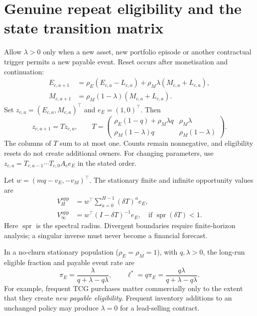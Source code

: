 \documentclass[11pt,a4paper]{article}
\begin{document}
\section{Genuine repeat eligibility and the state transition matrix}

Allow $\lambda>0$ only when a new asset, new portfolio episode or another contractual trigger permits a new payable event. Reset occurs after monetisation and continuation:
\begin{align}
 E_{c,a+1}&=\rho_E(E_{c,a}-L_{c,a})
             +\rho_M\lambda(M_{c,a}+L_{c,a}),\\
 M_{c,a+1}&=\rho_M(1-\lambda)(M_{c,a}+L_{c,a}).
\end{align}
Set $z_{c,a}=(E_{c,a},M_{c,a})^\top$ and $e_E=(1,0)^\top$. Then
\begin{equation}
 z_{c,a+1}=Tz_{c,a},\qquad
 T=\begin{pmatrix}
 \rho_E(1-q)+\rho_M\lambda q & \rho_M\lambda\\
 \rho_M(1-\lambda)q & \rho_M(1-\lambda)
 \end{pmatrix}.
 \label{eq:matrix}
\end{equation}
The columns of $T$ sum to at most one. Counts remain nonnegative, and eligibility resets do not create additional owners. For changing parameters, use $z_{c,a}=T_{c,a-1}\cdots T_{c,0}A_ce_E$ in the stated order.

Let $w=(mq-v_E,-v_M)^\top$. The stationary finite and infinite opportunity values are
\begin{align}
 V_H^{\mathrm{opp}}&=w^\top\sum_{a=0}^{H-1}(\delta T)^ae_E,\\
 V_\infty^{\mathrm{opp}}&=w^\top(I-\delta T)^{-1}e_E,
 \quad\text{if }\operatorname{spr}(\delta T)<1.
 \label{eq:resolvent}
\end{align}
Here $\operatorname{spr}$ is the spectral radius. Divergent boundaries require finite-horizon analysis; a singular inverse must never become a financial forecast.

In a no-churn stationary population ($\rho_E=\rho_M=1$), with $q,\lambda>0$, the long-run eligible fraction and payable event rate are
\begin{equation}
 \pi_E=\frac{\lambda}{q+\lambda-q\lambda},
 \qquad \ell^{*}=q\pi_E=\frac{q\lambda}{q+\lambda-q\lambda}.
\end{equation}
For example, frequent TCG purchases matter commercially only to the extent that they create \emph{new payable eligibility}. Frequent inventory additions to an unchanged policy may produce $\lambda=0$ for a lead-selling contract.
\end{document}
